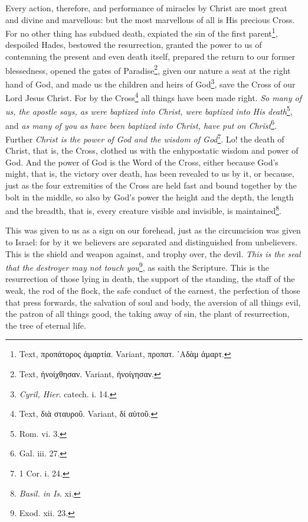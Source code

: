 Every action, therefore, and performance of miracles by Christ are most great and divine and marvellous: but the most marvellous of all is His precious Cross. For no other thing has subdued death, expiated the sin of the first parent\footnote{Text, \textgreek{προπάτορος ἁμαρτία}. Variant, \textgreek{προπατ. ᾽Αδὰμ ἁμαρτ}.}, despoiled Hades, bestowed the resurrection, granted the power to us of contemning the present and even death itself, prepared the return to our former blessedness, opened the gates of Paradise\footnote{Text, \textgreek{ἠνοίχθησαν}. Variant, \textgreek{ἠνοίγησαν}.}, given our nature a seat at the right hand of God, and made us the children and heirs of God\footnote{\emph{Cyril, Hier}. catech. i. 14.}, save the Cross of our Lord Jesus Christ. For by the Cross\footnote{Text, \textgreek{διὰ σταυροῦ}. Variant, \textgreek{δί αὐτοῦ}.} all things have been made right. \emph{So many of us, the apostle says, as were baptized into Christ, were baptized into His death}\footnote{Rom. vi. 3.}, and \emph{as many of you as have been baptized into Christ, have put on Christ}\footnote{Gal. iii. 27.}. Further \emph{Christ is the power of God and the wisdom of God}\footnote{1 Cor. i. 24.}. Lo! the death of Christ, that is, the Cross, clothed us with the enhypostatic wisdom and power of God. And the power of God is the Word of the Cross, either because God’s might, that is, the victory over death, has been revealed to us by it, or because, just as the four extremities of the Cross are held fast and bound together by the bolt in the middle, so also by God’s power the height and the depth, the length and the breadth, that is, every creature visible and invisible, is maintained\footnote{\emph{Basil. in Is}. xi.}.

This was given to us as a sign on our forehead, just as the circumcision was given to Israel: for by it we believers are separated and distinguished from unbelievers. This is the shield and weapon against, and trophy over, the devil. \emph{This is the seal that the destroyer may not touch you}\footnote{Exod. xii. 23.}, as saith the Scripture. This is the resurrection of those lying in death, the support of the standing, the staff of the weak, the rod of the flock, the safe conduct of the earnest, the perfection of those that press forwards, the salvation of soul and body, the aversion of all things evil, the patron of all things good, the taking away of sin, the plant of resurrection, the tree of eternal life.

